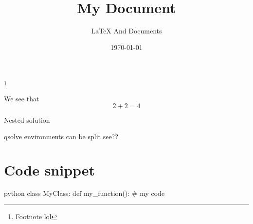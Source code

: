 \documentclass[12pt]{article}
\title{My Document}
\subtitle{LaTeX And Documents}
\date{\today}
\begin{document}
\maketitlestart
\blindtext[1]
\footnote{Footnote lol}
\begin{qsolve}[My conclusion]
	We see that $$2+2=4$$
	\begin{qsolve}[]
		Nested solution
	\end{qsolve}
    qsolve environments can be split
    \splitqsolve
    see??
\end{qsolve}
\vfil
\begin{conclusion}
	\blindtext
\end{conclusion}

\clearpage

\section{Code snippet}
\begin{codeblock}{python}
class MyClass:
def my_function():
# my code
\end{codeblock}

\clearpage
\blinddocument
\makeendpage
\end{document}
